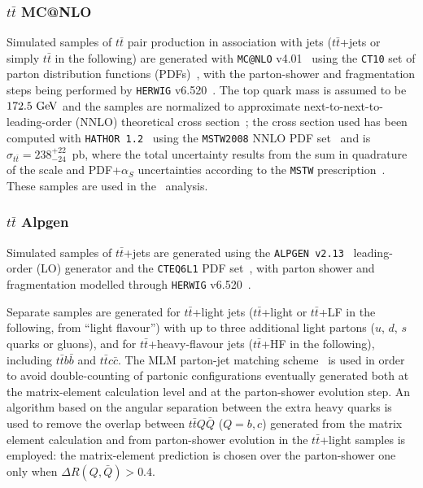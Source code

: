 \subsubsection{$t\bar{t}$ MC@NLO}\label{subsec:MC@NLO}
Simulated samples of $t\bar{t}$ pair production  in association with jets 
($t\bar{t}$+jets or simply $t\bar{t}$ in the following)
are generated with {\tt MC@NLO} v4.01~\cite{mcatnlo_1,mcatnlo_2,mcatnlo_3} using the {\tt CT10} set of parton distribution functions (PDFs)~\cite{ct10},
with the parton-shower and fragmentation steps being performed by 
{\tt HERWIG} v6.520~\cite{HERWIG}.
The top quark mass is assumed to be  $172.5\gev$ and 
the samples are normalized to approximate next-to-next-to-leading-order 
(NNLO) theoretical cross section~\cite{ttbarxs}; the cross section used 
has been computed with {\tt HATHOR 1.2}~\cite{ttbarxs} using the {\tt MSTW2008}
NNLO PDF set~\cite{Martin:2009iq} and is $\sigma_{t\bar{t}}= 238^{+22}_{-24}$~pb, 
where the total uncertainty results from the sum in quadrature of the 
scale and PDF+$\alpha_S$ uncertainties according to 
the {\tt MSTW} prescription~\cite{mstw2}. 
These samples are used in the \wbx\ analysis.

\subsubsection{$t\bar{t}$ Alpgen}\label{subsec:alpgen}
Simulated samples of $t\bar{t}$+jets are generated using
the {\tt ALPGEN v2.13}~\cite{ALPGEN} leading-order (LO) generator and the 
{\tt CTEQ6L1} PDF set~\cite{cteq6}, with parton shower and fragmentation  
modelled through {\tt HERWIG} v6.520~\cite{HERWIG}.

Separate samples are generated for $t\bar{t}$+light jets ($t\bar{t}$+light 
or $t\bar{t}$+LF in the following, from ``light flavour'') 
with up to three additional light partons ($u$, $d$, $s$ quarks or gluons),
and for $t\bar{t}$+heavy-flavour jets ($t\bar{t}$+HF in the following), 
including $t\bar{t}b\bar{b}$ and
$t\bar{t}c\bar{c}$.  
The MLM parton-jet matching scheme~\cite{mlm} is used
in order to avoid double-counting  of partonic configurations
eventually generated both at the matrix-element calculation level
and at the parton-shower evolution step.
An algorithm based on the angular separation
between the extra heavy quarks is used to remove 
the overlap between $t\bar{t}Q\bar{Q}$ ($Q=b,c$) 
generated from the matrix element calculation and 
from parton-shower evolution in the  $t\bar{t}$+light samples
is employed: the matrix-element prediction is chosen over the parton-shower one
only when $\Delta R(Q,\bar{Q})>0.4$.

